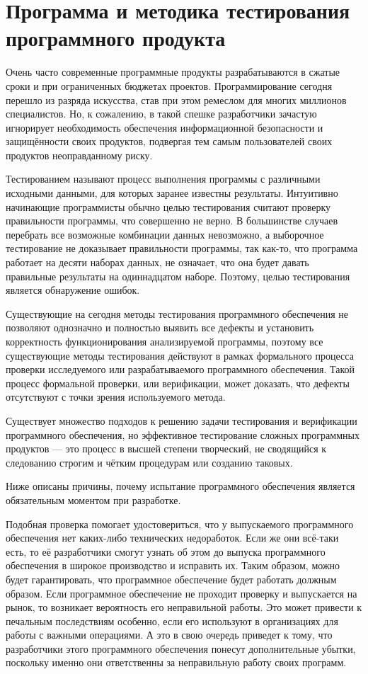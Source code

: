 \section{Программа и методика тестирования программного продукта}
\label{sec:practice:technology_used}

Очень часто современные программные продукты разрабатываются в сжатые сроки и при ограниченных бюджетах проектов. Программирование сегодня перешло из разряда искусства, став при этом ремеслом для многих миллионов специалистов. Но, к сожалению, в такой спешке разработчики зачастую игнорирует необходимость обеспечения информационной безопасности и защищённости своих продуктов, подвергая тем самым пользователей своих продуктов неоправданному риску.

Тестированием называют процесс выполнения программы с различными исходными данными, для которых заранее известны результаты. Интуитивно начинающие программисты обычно целью тестирования считают проверку правильности программы, что совершенно не верно. В большинстве случаев перебрать все возможные комбинации данных невозможно, а выборочное тестирование не доказывает правильности программы, так как-то, что программа работает на десяти наборах данных, не означает, что она будет давать правильные результаты на одиннадцатом наборе. Поэтому, целью тестирования является обнаружение ошибок.

Существующие на сегодня методы тестирования программного обеспечения не позволяют однозначно и полностью выявить все дефекты и установить корректность функционирования анализируемой программы, поэтому все существующие методы тестирования действуют в рамках формального процесса проверки исследуемого или разрабатываемого программного обеспечения.
Такой процесс формальной проверки, или верификации, может доказать, что дефекты отсутствуют с точки зрения используемого метода.

Существует множество подходов к решению задачи тестирования и верификации программного обеспечения, но эффективное тестирование сложных программных продуктов — это процесс в высшей степени творческий, не сводящийся к следованию строгим и чётким процедурам или созданию таковых.

Ниже описаны причины, почему испытание программного обеспечения является обязательным моментом при разработке.

Подобная проверка помогает удостовериться, что у выпускаемого программного обеспечения нет каких-либо технических недоработок. Если же они всё-таки есть, то её разработчики смогут узнать об этом до выпуска программного обеспечения в широкое производство и исправить их. Таким образом, можно будет гарантировать, что программное обеспечение будет работать должным образом.
Если программное обеспечение не проходит проверку и выпускается на рынок, то возникает вероятность его неправильной работы. Это может привести к печальным последствиям особенно, если его используют в организациях для работы с важными операциями. А это в свою очередь приведет к тому, что разработчики этого программного обеспечения понесут дополнительные убытки, поскольку именно они ответственны за неправильную работу своих программ.

